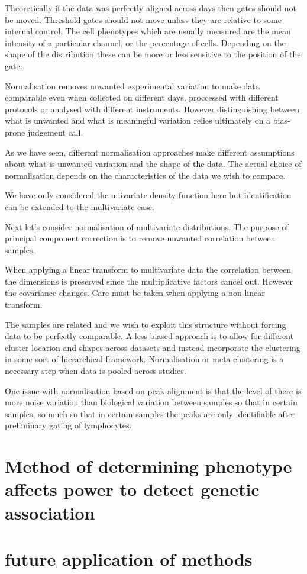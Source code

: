 Theoretically if the data was perfectly aligned across days then gates should not be moved.  
Threshold gates should not move unless they are relative to some internal control.
The cell phenotypes which are usually measured are the mean intensity of a particular channel, or the percentage of cells.
Depending on the shape of the distribution these can be more or less sensitive to the position of the gate.

Normalisation removes unwanted experimental variation to make data comparable even when collected on different days,
proccessed with different protocols or analysed with different instruments.
However distinguishing between what is unwanted and what is meaningful variation relies ultimately on a bias-prone judgement call.

As we have seen, different normalisation approaches make different assumptions about what is unwanted variation and the shape of the data.
The actual choice of normalisation depends on the characteristics of the data we wish to compare.

We have only considered the univariate density function here but identification can be extended to the multivariate case.

Next let's consider normalisation of multivariate distributions.  
The purpose of principal component correction is to remove unwanted correlation between samples.

When applying a linear transform to multivariate data the correlation between the dimensions is preserved since the multiplicative factors cancel out.
However the covariance changes.
Care must be taken when applying a non-linear transform.  

The samples are related and we wish to exploit this structure without forcing data to be perfectly comparable.
A less biased approach is to allow for different cluster location and shapes across datasets and instead incorporate the clustering in some sort of hierarchical framework.  
Normalisation or meta-clustering is a necessary step when data is pooled across studies.

One issue with normalisation based on peak alignment is that the level of there is more noise variation than biological variation between samples so that in certain samples,
so much so that in certain samples the peaks are only identifiable after preliminary gating of lymphocytes.





\section{ Method of determining phenotype affects power to detect genetic association }

\section{ future application of methods }



